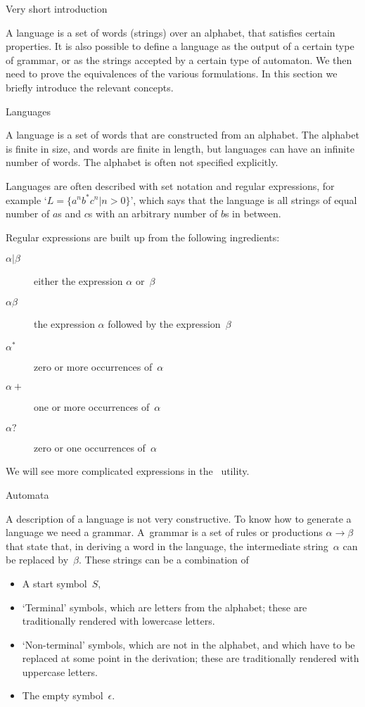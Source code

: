  {Very short introduction}

A language is a set of words (strings) over an alphabet, that satisfies
certain properties. It is also possible to define a language as the
output of a certain type of grammar, or as the strings accepted by a
certain type of automaton. We then need to prove the equivalences of
the various formulations. In this section we briefly introduce the
relevant concepts.

 {Languages}

A language is a set of words that are
constructed from an alphabet. The alphabet is finite
in size, and words are finite in length, but languages can have an
infinite number of words. The alphabet is often not specified
explicitly.

Languages are often described with set notation and regular expressions, for example
`$L=\{a^nb^*c^n|n>0\}$', which says that the language is all strings
of equal number of $a$s and $c$s with an arbitrary number of $b$s in
between.

Regular expressions are built up from the following ingredients:
\begin{description}
\item[$\alpha|\beta$] either the expression $\alpha$ or~$\beta$
\item[$\alpha\beta$] the expression $\alpha$ followed by the expression~$\beta$
\item[$\alpha^*$] zero or more occurrences of~$\alpha$
\item[$\alpha+$] one or more occurrences of~$\alpha$
\item[$\alpha?$] zero or one occurrences of~$\alpha$
\end{description}
We will see more complicated expressions in the \lex\ utility.

 {Automata}

A description of a language is not very constructive. To know how to
generate a language we need a grammar. A~grammar is a
set of rules or productions
$\alpha\rightarrow\beta$ that state that, in deriving a word in the
language, the intermediate string~$\alpha$ can be replaced
by~$\beta$. These strings can be a combination of
\begin{itemize}
\item A start symbol~$S$,
\item `Terminal' symbols, which are letters from the alphabet; these
  are traditionally rendered with lowercase letters.
\item `Non-terminal' symbols, which are not in the alphabet, and which
  have to be replaced at some point in the derivation; these are
  traditionally rendered with uppercase letters.
\item The empty symbol~$\epsilon$.
\end{itemize}

